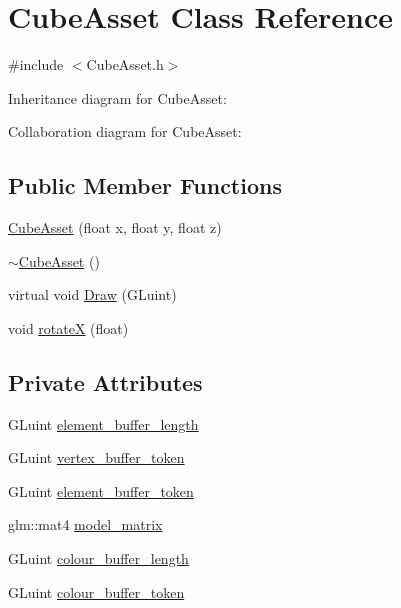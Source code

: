 \hypertarget{class_cube_asset}{}\section{Cube\+Asset Class Reference}
\label{class_cube_asset}


{\ttfamily \#include $<$Cube\+Asset.\+h$>$}



Inheritance diagram for Cube\+Asset\+:


Collaboration diagram for Cube\+Asset\+:
\subsection*{Public Member Functions}
\begin{DoxyCompactItemize}
\item 
\hyperlink{class_cube_asset_ad75b73237824794b0822c3404c554523}{Cube\+Asset} (float x, float y, float z)
\item 
\hyperlink{class_cube_asset_ab3ab9a5da82cbf8537a28652410093b1}{$\sim$\+Cube\+Asset} ()
\item 
virtual void \hyperlink{class_cube_asset_a1af568486056e254ffcf98fd99947bfe}{Draw} (G\+Luint)
\item 
void \hyperlink{class_cube_asset_ad3bd98dd1b0a34b3dc4234913e41c3e5}{rotate\+X} (float)
\end{DoxyCompactItemize}
\subsection*{Private Attributes}
\begin{DoxyCompactItemize}
\item 
G\+Luint \hyperlink{class_cube_asset_ac66c2ec869f392515dad4ebda1fe4792}{element\+\_\+buffer\+\_\+length}
\item 
G\+Luint \hyperlink{class_cube_asset_a31bd098f60e2c24988316a9cc9335987}{vertex\+\_\+buffer\+\_\+token}
\item 
G\+Luint \hyperlink{class_cube_asset_a4fae699256e7c5633a8174a93ca8a0ec}{element\+\_\+buffer\+\_\+token}
\item 
glm\+::mat4 \hyperlink{class_cube_asset_a49b69783f209cc8268a8be7d46c803d6}{model\+\_\+matrix}
\item 
G\+Luint \hyperlink{class_cube_asset_a12de81acb020b82bd26cda6284910012}{colour\+\_\+buffer\+\_\+length}
\item 
G\+Luint \hyperlink{class_cube_asset_a75f98d346175cd91cdee04f1885f5327}{colour\+\_\+buffer\+\_\+token}
\end{DoxyCompactItemize}


